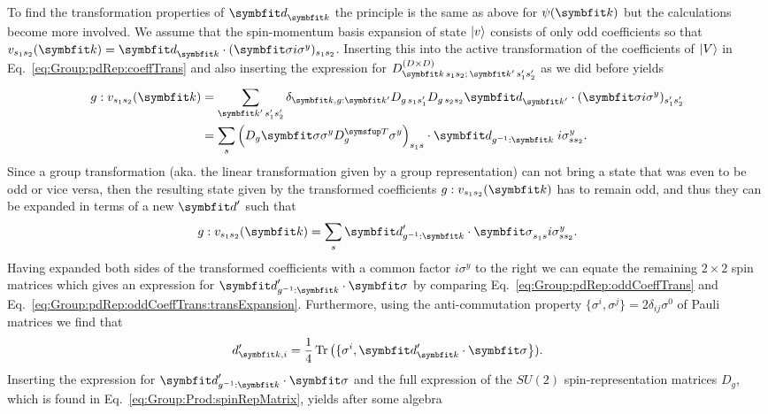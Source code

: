 To find the transformation properties of $\v{d}_\v{k}$ the principle is the same as above for $\psi(\v{k})$ but the calculations become more involved.
We assume that the spin-momentum basis expansion of state $\lvert v \rangle$ consists of only odd coefficients so that
$v_{s_1s_2}(\v{k}) = \v{d}_\v{k}\cdot(\v{\sigma}i\sigma^y)_{s_1s_2}$. Inserting this into the active transformation of the coefficients of $\lvert V \rangle$ in
Eq.~\eqref{eq:Group:pdRep:coeffTrans} and also inserting the expression for $D^{(D\times D)}_{\v{k}\,s_1s_2;\,\v{k}'\,s_1's_2'}$ as we did before yields
\begin{equation}
    \label{eq:Group:pdRep:oddCoeffTrans}
    \begin{split}
        g:v_{s_1s_2}(\v{k}) &= \sum_{\v{k}'\,s_1's_2'}\delta_{\v{k},g:\v{k}'}D_{g\,s_1s_1'}D_{g\,s_2s_2}\v{d}_{\v{k}'}\cdot(\v{\sigma}i\sigma^y)_{s_1's_2'}\\
        &= \sum_s\Big(D_g\v{\sigma}\sigma^yD_g^\trans\sigma^y\Big)_{s_1s}\cdot\v{d}_{g^{-1}:\v{k}}\;i\sigma^y_{ss_2}.
    \end{split}
\end{equation}
Since a group transformation (aka. the linear transformation given by a group representation) can not bring a state that was even to be odd or vice versa,
then the resulting state given by the transformed coefficients $g:v_{s_1s_2}(\v{k})$ has to remain odd, and thus they can be expanded in terms of a new
$\v{d}'$ such that 
\begin{equation}
    \label{eq:Group:pdRep:oddCoeffTrans:transExpansion}
    g:v_{s_1s_2}(\v{k}) = \sum_s\v{d}'_{g^{-1}:\v{k}}\cdot\v{\sigma}_{s_1s}i\sigma^y_{ss_2}.
\end{equation}
Having expanded both sides of the transformed coefficients with a common factor $i\sigma^y$ to the right we can equate the remaining $2\times2$ spin
matrices which gives an expression for $\v{d}'_{g^{-1}:\v{k}}\cdot\v{\sigma}$ by comparing Eq.~\eqref{eq:Group:pdRep:oddCoeffTrans} and
Eq.~\eqref{eq:Group:pdRep:oddCoeffTrans:transExpansion}.
Furthermore, using the anti-commutation property $\{\sigma^i,\sigma^j\} = 2\delta_{ij}\sigma^0$ of Pauli matrices we find that
\begin{equation}
    \label{eq:Group:pdRep:projectingD}
    d'_{\v{k},i} = \frac{1}{4}\tr\big(\{\sigma^i, \v{d}'_\v{k}\cdot\v{\sigma}\big\}).
\end{equation}
Inserting the expression for $\v{d}'_{g^{-1}:\v{k}}\cdot\v{\sigma}$ and the full expression of the $SU(2)$ spin-representation matrices $D_g$, which
is found in  Eq.~\eqref{eq:Group:Prod:spinRepMatrix}, yields after some algebra
